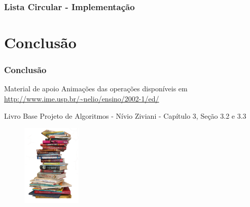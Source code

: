 \documentclass[aspectratio=169]{beamer}
\begin{document}

\begin{frame}
\frametitle{Lista Circular - Implementação}
\end{frame}

%
%
%
%

\section{Conclusão}
\begin{frame}
\frametitle{Conclusão}

\begin{block} {Material de apoio}
 Animações das operações disponíveis em \href{https://www.ime.usp.br/~nelio/ensino/2002-1/ed/}{http://www.ime.usp.br/\~{ }nelio/ensino/2002-1/ed/}
\end{block}
\begin{block}{Livro Base}
Projeto de Algoritmos - Nívio Ziviani - Capítulo 3, Seção 3.2 e 3.3
\end{block}
\end{frame}



\begin{frame}
\titlepage %

\begin{figure}[!h]
  \centering
   \includegraphics[width=80pt]{imgs/introducao.png}
  \label{fig_introducao}
\end{figure}
\end{frame}

\end{document}
